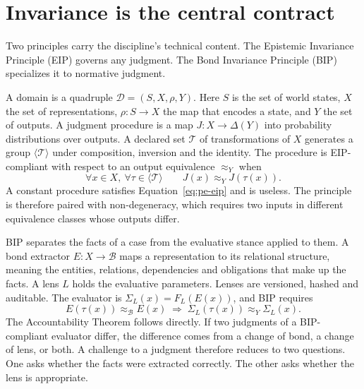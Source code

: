 \section{Invariance is the central contract}\label{sec:pe-invariance}

Two principles carry the discipline's technical content. The Epistemic Invariance Principle (EIP)
governs any judgment. The Bond Invariance Principle (BIP) specializes it to normative judgment.

A domain is a quadruple $\mathcal{D} = (S, X, \rho, Y)$. Here $S$ is the set of world states, $X$
the set of representations, $\rho \colon S \to X$ the map that encodes a state, and $Y$ the set of
outputs. A judgment procedure is a map $J \colon X \to \Delta(Y)$ into probability distributions
over outputs. A declared set $\mathcal{T}$ of transformations of $X$ generates a group
$\langle \mathcal{T} \rangle$ under composition, inversion and the identity.
The procedure is EIP-compliant with respect to an output equivalence $\approx_Y$ when
\begin{equation}
\forall x \in X,\ \forall \tau \in \langle \mathcal{T} \rangle \qquad J(x) \approx_Y J(\tau(x)).
\label{eq:pe-eip}
\end{equation}
A constant procedure satisfies Equation~\eqref{eq:pe-eip} and is useless. The principle is
therefore paired with non-degeneracy, which requires two inputs in different equivalence classes
whose outputs differ.

BIP separates the facts of a case from the evaluative stance applied to them. A bond extractor
$E \colon X \to \mathcal{B}$ maps a representation to its relational structure, meaning the
entities, relations, dependencies and obligations that make up the facts. A lens $L$ holds the
evaluative parameters. Lenses are versioned, hashed and auditable. The evaluator is
$\Sigma_L(x) = F_L(E(x))$, and BIP requires
\begin{equation}
E(\tau(x)) \approx_{\mathcal{B}} E(x) \;\Longrightarrow\; \Sigma_L(\tau(x)) \approx_Y \Sigma_L(x).
\label{eq:pe-bip}
\end{equation}
The Accountability Theorem follows directly. If two judgments of a BIP-compliant evaluator
differ, the difference comes from a change of bond, a change of lens, or both. A challenge to a
judgment therefore reduces to two questions. One asks whether the facts were extracted
correctly. The other asks whether the lens is appropriate.

